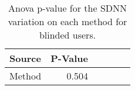 
\begin{table}[!htb]
\centering
\caption{Anova p-value for the SDNN variation on each method for blinded users.}
\label{tab:blocanova_sdnn_var_sight}
\begin{tabular}{lrrrrr}
\toprule
Source & P-Value \\
\midrule
Method &   0.504 \\
\bottomrule
\end{tabular}
\end{table}

